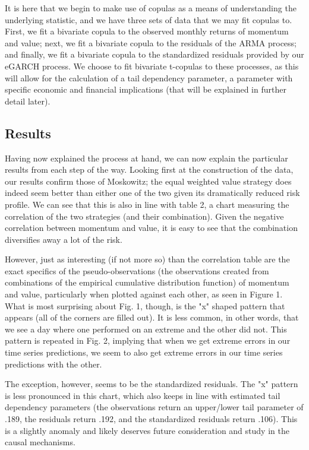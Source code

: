 \documentclass[11pt,letterpaper]{memoir}
\begin{document}
It is here that we begin to make use of copulas as a means of understanding the underlying statistic, and we have three sets of data that we may fit copulas to. First, we fit a bivariate copula to the observed monthly returns of momentum and value; next, we fit a bivariate copula to the residuals of the ARMA process; and finally, we fit a bivariate copula to the standardized residuals provided by our eGARCH process. We choose to fit bivariate t-copulas to these processes, as this will allow for the calculation of a tail dependency parameter, a parameter with specific economic and financial implications (that will be explained in further detail later).

\subsection*{Results}
Having now explained the process at hand, we can now explain the particular results from each step of the way. Looking first at the construction of the data, our results confirm those of Moskowitz; the equal weighted value strategy does indeed seem better than either one of the two given its dramatically reduced risk profile. We can see that this is also in line with table 2, a chart measuring the correlation of the two strategies (and their combination). Given the negative correlation between momentum and value, it is easy to see that the combination diversifies away a lot of the risk.

However, just as interesting (if not more so) than the correlation table are the exact specifics of the pseudo-observations (the observations created from combinations of the empirical cumulative distribution function) of momentum and value, particularly when plotted against each other, as seen in Figure 1. What is most surprising about Fig. 1, though, is the "x" shaped pattern that appears (all of the corners are filled out). It is less common, in other words, that we see a day where one performed on an extreme and the other did not. This pattern is repeated in Fig. 2, implying that when we get extreme errors in our time series predictions, we seem to also get extreme errors in our time series predictions with the other.

The exception, however, seems to be the standardized residuals. The "x" pattern is less pronounced in this chart, which also keeps in line with estimated tail dependency parameters (the observations return an upper/lower tail parameter of .189, the residuals return .192, and the standardized residuals return .106). This is a slightly anomaly and likely deserves future consideration and study in the causal mechanisms.
\end{document}
